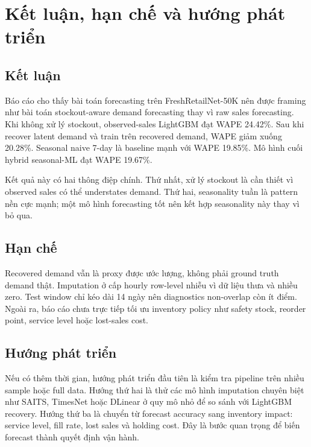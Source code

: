 \section{Kết luận, hạn chế và hướng phát triển}

\subsection{Kết luận}

Báo cáo cho thấy bài toán forecasting trên FreshRetailNet-50K nên được framing như bài toán stockout-aware demand forecasting thay vì raw sales forecasting. Khi không xử lý stockout, observed-sales LightGBM đạt WAPE 24.42\%. Sau khi recover latent demand và train trên recovered demand, WAPE giảm xuống 20.28\%. Seasonal naive 7-day là baseline mạnh với WAPE 19.85\%. Mô hình cuối hybrid seasonal-ML đạt WAPE 19.67\%.

Kết quả này có hai thông điệp chính. Thứ nhất, xử lý stockout là cần thiết vì observed sales có thể understates demand. Thứ hai, seasonality tuần là pattern nền cực mạnh; một mô hình forecasting tốt nên kết hợp seasonality này thay vì bỏ qua.

\subsection{Hạn chế}

Recovered demand vẫn là proxy được ước lượng, không phải ground truth demand thật. Imputation ở cấp hourly row-level nhiễu vì dữ liệu thưa và nhiều zero. Test window chỉ kéo dài 14 ngày nên diagnostics non-overlap còn ít điểm. Ngoài ra, báo cáo chưa trực tiếp tối ưu inventory policy như safety stock, reorder point, service level hoặc lost-sales cost.

\subsection{Hướng phát triển}

Nếu có thêm thời gian, hướng phát triển đầu tiên là kiểm tra pipeline trên nhiều sample hoặc full data. Hướng thứ hai là thử các mô hình imputation chuyên biệt như SAITS, TimesNet hoặc DLinear ở quy mô nhỏ để so sánh với LightGBM recovery. Hướng thứ ba là chuyển từ forecast accuracy sang inventory impact: service level, fill rate, lost sales và holding cost. Đây là bước quan trọng để biến forecast thành quyết định vận hành.
